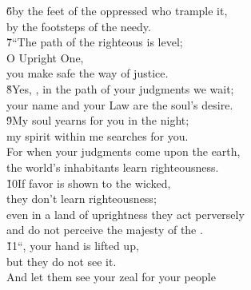 \begin{poetry}
\poeml \v{6}by the feet of the oppressed who trample it, \\
\poeml by the footsteps of the needy. \\
\poeml \v{7}``The path of the righteous is level; \\
\poemll    O Upright One, \\
\poemlll       you make safe the way of justice. \\
\poeml \v{8}Yes, , in the path of your judgments we wait; \\
\poemll    your name and your Law are the soul's desire. \\
\poeml \v{9}My soul yearns for you in the night; \\
\poemll    my spirit within me searches for you. \\
\poeml For when your judgments come upon the earth, \\
\poemll    the world's inhabitants learn righteousness. \\
\poeml \v{10}If favor is shown to the wicked, \\
\poemll    they don't learn righteousness; \\
\poeml even in a land of uprightness they act perversely \\
\poemll    and do not perceive the majesty of the . \\
\poeml \v{11}``, your hand is lifted up, \\
\poemll    but they do not see it. \\
\poeml And let them see your zeal for your people \\

\end{poetry}
